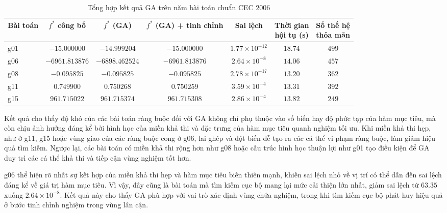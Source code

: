 \begin{table}[htbp]
\centering
\caption{Tổng hợp kết quả GA trên năm bài toán chuẩn CEC 2006}
\label{tab:kq-co-rang-buoc}
\footnotesize
\setlength{\tabcolsep}{4pt}
\begin{tabular}{lcccccc}
\toprule
\textbf{Bài toán} & $f^{*}$ \textbf{công bố} & $f^{*}$ \textbf{(GA)}
& \shortstack{$f^{*}$ \textbf{(GA)}\\\textbf{+ tinh chỉnh}}
& \textbf{Sai lệch}
& \shortstack{\textbf{Thời gian}\\\textbf{hội tụ (s)}}
& \shortstack{\textbf{Số thế hệ}\\\textbf{thỏa mãn}} \\
\midrule
g01 & $-15.000000$   & $-14.999204$   & $-15.000000$   & $1.77\times10^{-12}$ & $18.74$ & $499$ \\
g06 & $-6961.813876$ & $-6898.462524$ & $-6961.813876$ & $2.64\times10^{-8}$ & $14.06$ & $457$ \\
g08 & $-0.095825$    & $-0.095825$    & $-0.095825$    & $2.78\times10^{-17}$ & $13.20$ & $362$ \\
g11 & $0.749900$     & $0.750268$     & $0.750259$     & $3.59\times10^{-4}$  & $13.31$ & $392$ \\
g15 & $961.715022$   & $961.715374$   & $961.715308$   & $2.86\times10^{-4}$  & $13.82$ & $249$ \\
\bottomrule
\end{tabular}
\end{table}

Kết quả cho thấy độ khó của các bài toán ràng buộc đối với GA không
chỉ phụ thuộc vào số biến hay độ phức tạp của hàm mục tiêu, mà còn
chịu ảnh hưởng đáng kể bởi hình học của miền khả thi và đặc trưng của
hàm mục tiêu quanh nghiệm tối ưu. Khi miền khả thi hẹp, như ở g11, g15
hoặc vùng giao của các ràng buộc cong ở g06, lai ghép và đột biến dễ
tạo ra các cá thể vi phạm ràng buộc, làm giảm hiệu quả tìm kiếm. Ngược
lại, các bài toán có miền khả thi rộng hơn như g08 hoặc cấu trúc hình
học thuận lợi như g01 tạo điều kiện để GA duy trì các cá thể khả thi
và tiếp cận vùng nghiệm tốt hơn.

g06 thể hiện rõ nhất sự kết hợp của miền khả thi hẹp và hàm mục tiêu
biến thiên mạnh, khiến sai lệch nhỏ về vị trí có thể dẫn đến sai lệch
đáng kể về giá trị hàm mục tiêu. Vì vậy, đây cũng là bài toán mà tìm
kiếm cục bộ mang lại mức cải thiện lớn nhất, giảm sai lệch từ
$63.35$ xuống $2.64\times10^{-8}$. Kết quả này cho thấy GA phù hợp
với vai trò xác định vùng chứa nghiệm, trong khi tìm kiếm cục bộ phát
huy hiệu quả ở bước tinh chỉnh nghiệm trong vùng lân cận.

